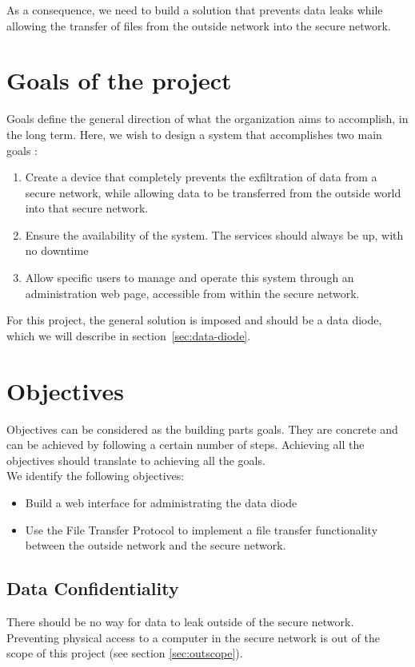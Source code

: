 \documentclass[a4paper,11pt]{article}
\begin{document}
As a consequence, we need to build a solution that prevents data leaks while allowing the transfer of files from the outside network into the secure network.

\section{Goals of the project}
\label{sec:goals}
Goals define the general direction of what the organization aims to accomplish, in the long term. Here, we wish to design a system that accomplishes two main goals :

\begin{enumerate}
\item{Create a device that completely prevents the exfiltration of data from a secure network, while allowing data to be transferred from the outside world into that secure network.}
\item{Ensure the availability of the system. The services should always be up, with no downtime}
\item{Allow specific users to manage and operate this system through an administration web page, accessible from within the secure network.}
\end{enumerate}

For this project, the general solution is imposed and should be a data diode, which we will describe in section~\ref{sec:data-diode}.


\section{Objectives}
\label{sec:objectives}
Objectives can be considered as the building parts goals. They are concrete and can be achieved by following a certain number of steps. Achieving all the objectives should translate to achieving all the goals.\\


We identify the following objectives:
\begin{itemize}
\item{Build a web interface for administrating the data diode}
\item{Use the File Transfer Protocol to implement a file transfer functionality between the outside network and the secure network.}
\end{itemize}

\subsection{Data Confidentiality}
There should be no way for data to leak outside of the secure network. Preventing physical access to a computer in the secure network is out of the scope of this project (see section \ref{sec:outscope}).\\
\end{document}

